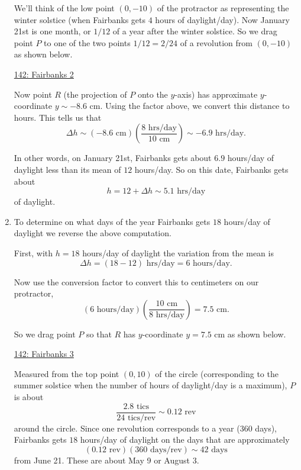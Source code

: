 \documentclass{ximera}
\begin{document}
\begin{example}
\begin{explanation}
\begin{enumerate}
We'll think of the low point $(0,-10)$ of the protractor as representing the winter solstice (when Fairbanks gets $4$ hours of daylight/day). Now January 21st is one month, or $1/12$ of a year after the winter solstice. So we drag point $P$ to one of the two points $1/12 = 2/24$ of a revolution from $(0,-10)$ as shown below.


\begin{onlineOnly}
    \begin{center}
\end{center}
\end{onlineOnly}

\href{https://www.desmos.com/calculator/4xsc9i7i4s}{142: Fairbanks 2}

Now point $R$ (the projection of $P$ onto the $y$-axis) has approximate $y$-coordinate $y\sim-8.6$ cm. Using the factor above, we convert this distance to hours. This tells us that
\[
  \Delta h \sim (-8.6 \text{ cm})\left( \frac{8 \text{ hrs/day}}{10 \text{ cm}} \right) \sim -6.9\text{ hrs/day}.
\] 

In other words, on January 21st, Fairbanks gets about $6.9$ hours/day of daylight less than its mean of $12$ hours/day. So on this date, Fairbanks gets about
\[
   h = 12  + \Delta h \sim 5.1 \text{ hrs/day} 
\]
of daylight.

\item To determine on what days of the year Fairbanks gets $18$ hours/day of daylight we reverse the above computation. 

First, with $h=18$ hours/day of daylight the variation from the mean is
\[
  \Delta h = (18-12)\text{ hrs/day} = 6 \text{ hours/day} .
\]

Now use the conversion factor to convert this to centimeters on our protractor, 
\[
       (6 \text{ hours/day}) \left( \frac{10 \text{ cm}}{8 \text{ hrs/day}} \right) = 7.5\text{ cm}. 
\]

So we drag point $P$ so that $R$ has $y$-coordinate $y=7.5$ cm as shown below.

\begin{onlineOnly}
    \begin{center}
\end{center}
\end{onlineOnly}

\href{https://www.desmos.com/calculator/xvy6s6aw41}{142: Fairbanks 3}

Measured from the top point $(0,10)$ of the circle (corresponding to the summer solstice when the number of hours of daylight/day is a maximum), $P$ is about
\[
      \frac{2.8\text{ tics}}{24\text{ tics/rev}} \sim 0.12\text{ rev}
\]
around the circle. Since one revolution corresponds to a year (360 days), Fairbanks gets $18$ hours/day of daylight on the days that are approximately
\[ 
   ( 0.12\text{ rev}) ( 360 \text{ days/rev}   )  \sim 42\text{ days}
\]
from June 21. These are about May 9 or August 3.

\end{enumerate}
\end{explanation}

\end{example}
\end{document}
